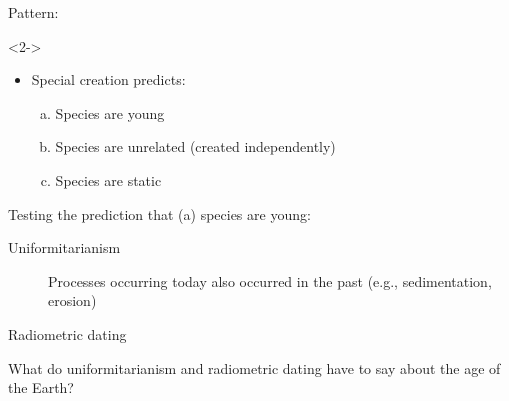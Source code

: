 \begin{frame}

    Pattern:

    \begin{uncoverenv}<2->
    \begin{itemize}
        \item Special creation predicts:
        \begin{enumerate}[a)]
            \item Species are young
            \item Species are unrelated (created independently)
            \item Species are static
        \end{enumerate}
    \end{itemize}
    \end{uncoverenv}

\end{frame}

\begin{frame}

    Testing the prediction that (a) species are young:

    \begin{description}
        \item[Uniformitarianism] Processes occurring today also occurred in the
            past (e.g., sedimentation, erosion) 
        \item[Radiometric dating]
    \end{description}

    What do uniformitarianism and radiometric dating have to say about the age
    of the Earth? \\



\end{frame}

